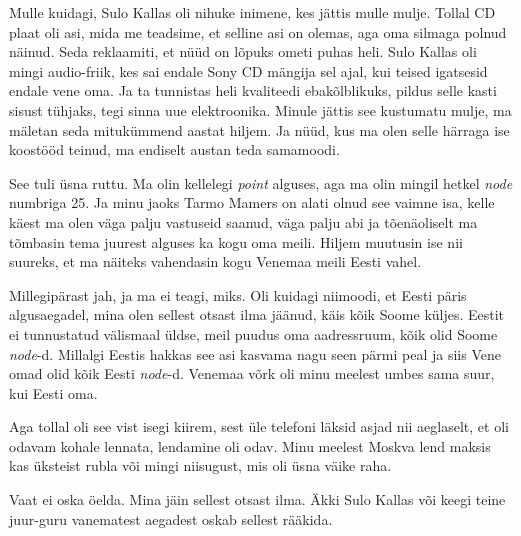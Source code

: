 
Mulle kuidagi, Sulo Kallas oli nihuke inimene, kes jättis mulle mulje. Tollal CD plaat oli asi, mida me teadsime, et selline asi on olemas, aga oma silmaga polnud näinud. Seda reklaamiti, et  nüüd on lõpuks ometi puhas heli. Sulo Kallas oli mingi audio-friik, kes sai endale Sony CD mängija sel ajal, kui teised igatsesid endale vene oma. Ja  ta tunnistas heli kvaliteedi ebakõlblikuks, pildus selle kasti sisust tühjaks, tegi sinna uue elektroonika. Minule jättis see kustumatu mulje, ma mäletan seda mitukümmend aastat hiljem. Ja nüüd, kus ma olen selle härraga  ise koostööd teinud, ma endiselt austan teda samamoodi. 


See tuli üsna ruttu. Ma olin kellelegi \emph{point} alguses, aga ma olin mingil hetkel  \emph{node} numbriga 25. Ja minu jaoks Tarmo Mamers on  alati olnud see vaimne isa, kelle käest ma olen väga palju vastuseid saanud, väga palju abi ja tõenäoliselt ma tõmbasin tema juurest alguses ka kogu oma meili. Hiljem muutusin ise nii suureks, et ma näiteks vahendasin kogu Venemaa meili Eesti vahel. 


Millegipärast jah, ja ma ei teagi, miks. Oli kuidagi niimoodi, et Eesti päris algusaegadel, mina olen sellest otsast ilma jäänud, käis kõik Soome küljes. Eestit ei tunnustatud välismaal üldse, meil puudus oma aadressruum, kõik olid Soome \emph{node}-d. Millalgi Eestis hakkas see asi kasvama nagu seen pärmi peal ja siis Vene omad olid kõik Eesti \emph{node}-d. Venemaa võrk oli minu meelest umbes sama suur, kui Eesti oma. 


Aga tollal oli see vist isegi kiirem, sest üle telefoni läksid asjad nii aeglaselt, et oli odavam kohale lennata,   lendamine oli odav. Minu meelest Moskva lend maksis kas üksteist rubla või mingi niisugust, mis oli üsna väike raha.


Vaat ei oska öelda. Mina jäin sellest otsast ilma. Äkki Sulo Kallas või keegi teine juur-guru vanematest aegadest oskab sellest rääkida. 

